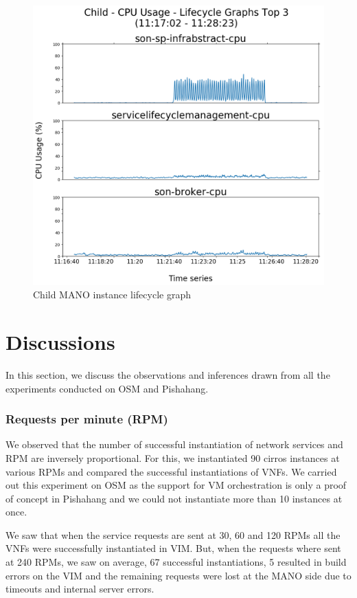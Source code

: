 \begin{figure}
	\centering
	\includegraphics[width=0.65\linewidth]{figures/scalability_graphs/Scalability-Evaluation/Child-TOP-3-Lifecycle}
	\caption{Child MANO instance lifecycle graph}
	\label{fig:child-top-3-lifecycle}
\end{figure}

\pagebreak

\section{Discussions}

In this section, we discuss the observations and inferences drawn from all the experiments conducted on OSM and Pishahang.

\subsubsection{Requests per minute (RPM)}

We observed that the number of successful instantiation of network services and RPM are inversely proportional. For this, we instantiated 90 cirros instances at various RPMs and compared the successful instantiations of VNFs. We carried out this experiment on OSM as the support for VM orchestration is only a proof of concept in Pishahang and we could not instantiate more than 10 instances at once.

We saw that when the service requests are sent at 30, 60 and 120 RPMs all the VNFs were successfully instantiated in VIM. But, when the requests where sent at 240 RPMs, we saw on average, 67 successful instantiations, 5 resulted in build errors on the VIM and the remaining requests were lost at the MANO side due to timeouts and internal server errors. 

